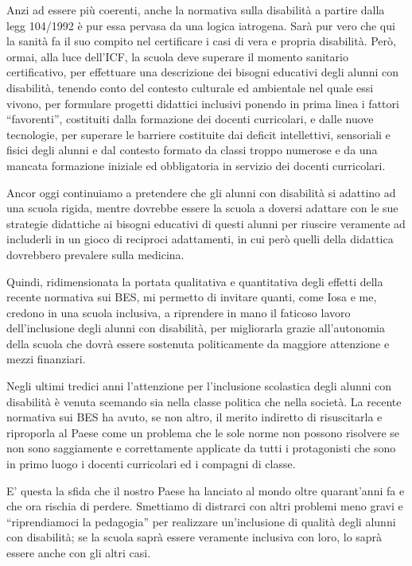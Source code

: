 Anzi ad essere più coerenti, anche la normativa sulla disabilità a partire dalla legg 104/1992 è pur essa pervasa da una logica iatrogena. Sarà pur vero che qui la sanità fa il suo compito nel certificare i casi di vera e propria disabilità. Però, ormai, alla luce dell’ICF, la scuola deve superare il momento sanitario certificativo, per effettuare una descrizione dei bisogni educativi degli alunni con disabilità, tenendo conto del contesto culturale ed ambientale nel quale essi vivono, per formulare progetti didattici inclusivi ponendo in prima linea i fattori “favorenti”, costituiti dalla formazione dei docenti curricolari, e dalle nuove tecnologie, per superare le barriere costituite dai deficit intellettivi, sensoriali e fisici degli alunni e dal contesto formato da classi troppo numerose e da una mancata formazione iniziale ed obbligatoria in servizio dei docenti curricolari.

Ancor oggi continuiamo a pretendere che gli alunni con disabilità si adattino ad una scuola rigida, mentre dovrebbe essere la scuola a doversi adattare con le sue strategie didattiche ai bisogni educativi di questi alunni per riuscire veramente ad includerli in un gioco di reciproci adattamenti, in cui però quelli della didattica dovrebbero prevalere sulla medicina.

Quindi, ridimensionata la portata qualitativa e quantitativa degli effetti della recente normativa sui BES, mi permetto di invitare quanti, come Iosa e me, credono in una scuola inclusiva, a riprendere in mano il faticoso lavoro dell’inclusione degli alunni con disabilità, per migliorarla grazie all’autonomia della scuola che dovrà essere sostenuta politicamente da maggiore attenzione e mezzi finanziari.

Negli ultimi tredici anni l’attenzione per l’inclusione scolastica degli alunni con disabilità è venuta scemando sia nella classe politica che nella società. La recente normativa sui BES ha avuto, se non altro, il merito indiretto di risuscitarla e riproporla al Paese come un problema che le sole norme non possono risolvere se non sono saggiamente e correttamente applicate da tutti i protagonisti che sono in primo luogo i docenti curricolari ed i compagni di classe.

E’ questa la sfida che il nostro Paese ha lanciato al mondo oltre quarant’anni fa e che ora rischia di perdere. Smettiamo di distrarci con altri problemi meno gravi e “riprendiamoci la pedagogia” per realizzare un’inclusione di qualità degli alunni con disabilità; se la scuola saprà essere veramente inclusiva con loro, lo saprà essere anche con gli altri casi.